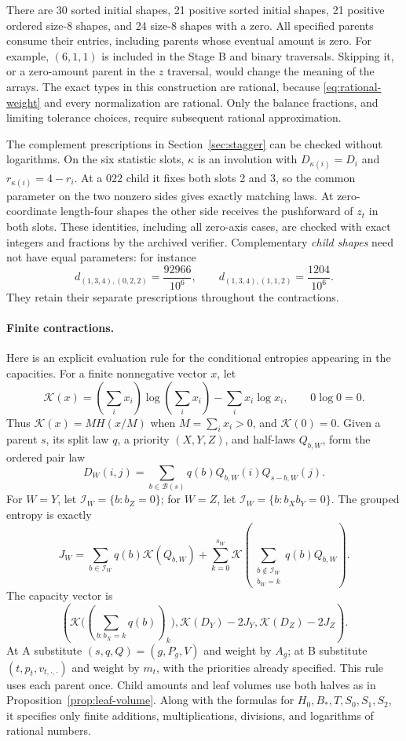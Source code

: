 There are 30 sorted initial shapes, 21 positive sorted initial shapes,
21 positive ordered size-8 shapes, and 24 size-8 shapes with a zero.
All specified parents consume their entries, including parents whose eventual
amount is zero. For example, $(6,1,1)$ is included in the Stage B and binary
traversals. Skipping it, or a zero-amount parent in the $z$ traversal, would
change the meaning of the arrays. The exact types in this construction are
rational, because \eqref{eq:rational-weight} and every normalization are
rational. Only the balance fractions, and limiting tolerance choices, require
subsequent rational approximation.

The complement prescriptions in Section~\ref{sec:stagger} can be checked
without logarithms. On the six statistic slots, $\kappa$ is an involution
with $D_{\kappa(i)}=D_i$ and $r_{\kappa(i)}=4-r_i$. At a $022$ child it fixes
both slots 2 and 3, so the common parameter on the two nonzero sides gives
exactly matching laws. At zero-coordinate length-four shapes the other side
receives the pushforward of $z_t$ in both slots. These identities, including
all zero-axis cases, are checked with exact integers and fractions by the
archived verifier. Complementary \emph{child shapes} need not have equal
parameters: for instance
\[
 d_{(1,3,4),(0,2,2)}=\frac{92966}{10^6},\qquad
 d_{(1,3,4),(1,1,2)}=\frac{1204}{10^6}.
\]
They retain their separate prescriptions throughout the contractions.

\paragraph{Finite contractions.}
Here is an explicit evaluation rule for the conditional entropies appearing
in the capacities. For a finite nonnegative vector $x$, let
\[
 \mathcal K(x)=\left(\sum_i x_i\right)\log\left(\sum_i x_i\right)
                   -\sum_i x_i\log x_i,
 \qquad 0\log0=0.
\]
Thus $\mathcal K(x)=M H(x/M)$ when $M=\sum_i x_i>0$, and
$\mathcal K(0)=0$. Given a parent $s$, its split law $q$, a priority
$(X,Y,Z)$, and half-laws $Q_{b,W}$, form the ordered pair law
\[
 D_W(i,j)=\sum_{b\in\mathcal B(s)}q(b)Q_{b,W}(i)Q_{s-b,W}(j).
\]
For $W=Y$, let $\mathcal I_W=\{b:b_Z=0\}$; for $W=Z$, let
$\mathcal I_W=\{b:b_Xb_Y=0\}$. The grouped entropy is exactly
\begin{equation}\label{eq:finite-group-contraction}
 J_W=\sum_{b\in\mathcal I_W}q(b)\mathcal K(Q_{b,W})
       +\sum_{k=0}^{s_W}
        \mathcal K\left(\sum_{\substack{b\notin\mathcal I_W\\b_W=k}}
                                     q(b)Q_{b,W}\right).
\end{equation}
The capacity vector is
\[
 \left(\mathcal K\bigl((\sum_{b:b_X=k}q(b))_k\bigr),
        \mathcal K(D_Y)-2J_Y,\mathcal K(D_Z)-2J_Z\right).
\]
At A substitute $(s,q,Q)=(g,P_g,V)$ and weight by $A_g$; at B substitute
$(t,p_t,v_{t,\cdot,\cdot})$ and weight by $m_t$, with the priorities already
specified. This rule uses each parent once. Child amounts and leaf volumes
use both halves as in Proposition~\ref{prop:leaf-volume}. Along with the
formulas for $H_0,B_*,T,S_0,S_1,S_2$, it specifies only finite additions,
multiplications, divisions, and logarithms of rational numbers.

